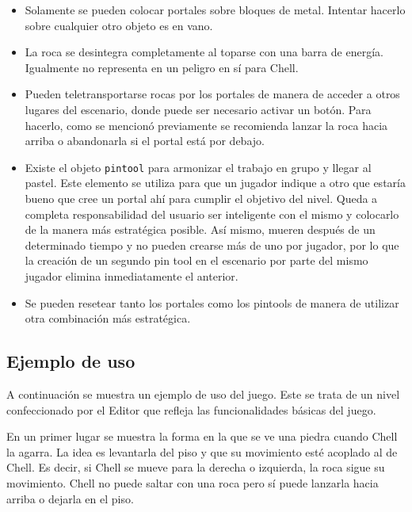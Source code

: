 \documentclass[a4paper]{article}
\begin{document}
\begin{itemize}
	\item Solamente se pueden colocar portales sobre bloques de metal. Intentar hacerlo sobre cualquier otro objeto es en vano.
	
	\item La roca se desintegra completamente al toparse con una barra de energía. Igualmente no representa en un peligro en sí para Chell.
	
	\item Pueden teletransportarse rocas por los portales de manera de acceder a otros lugares del escenario, donde puede ser necesario activar un botón. Para hacerlo, como se mencionó previamente se recomienda lanzar la roca hacia arriba o abandonarla si el portal está por debajo.
	
	\item Existe el objeto \texttt{pintool} para armonizar el trabajo en grupo y llegar al pastel. Este elemento se utiliza para que un jugador indique a otro que estaría bueno que cree un portal ahí para cumplir el objetivo del nivel. Queda a completa responsabilidad del usuario ser inteligente con el mismo y colocarlo de la manera más estratégica posible. Así mismo, mueren después de un determinado tiempo y no pueden crearse más de uno por jugador, por lo que la creación de un segundo pin tool en el escenario por parte del mismo jugador elimina inmediatamente el anterior.
	
	\item Se pueden resetear tanto los portales como los pintools de manera de utilizar otra combinación más estratégica.
\end{itemize}

\subsection{Ejemplo de uso}

A continuación se muestra un ejemplo de uso del juego. Este se trata de un nivel confeccionado por el Editor que refleja las funcionalidades básicas del juego. 

En un primer lugar se muestra la forma en la que se ve una piedra cuando Chell la agarra. La idea es levantarla del piso y que su movimiento esté acoplado al de Chell. Es decir, si Chell se mueve para la derecha o izquierda, la roca sigue su movimiento. Chell no puede saltar con una roca pero sí puede lanzarla hacia arriba o dejarla en el piso.
\end{document}
